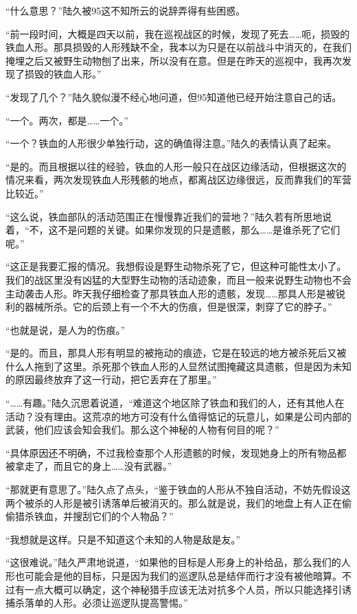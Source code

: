 “什么意思？”陆久被95这不知所云的说辞弄得有些困惑。

“前一段时间，大概是四天以前，我在巡视战区的时候，发现了死去……呃，损毁的铁血人形。那具损毁的人形残缺不全，我本以为只是在以前战斗中消灭的，在我们掩埋之后又被野生动物刨了出来，所以没有在意。但是在昨天的巡视中，我再次发现了损毁的铁血人形。”

“发现了几个？”陆久貌似漫不经心地问道，但95知道他已经开始注意自己的话。

“一个。两次，都是……一个。”

“一个？铁血的人形很少单独行动，这的确值得注意。”陆久的表情认真了起来。

“是的。而且根据以往的经验，铁血的人形一般只在战区边缘活动，但根据这次的情况来看，两次发现铁血人形残骸的地点，都离战区边缘很远，反而靠我们的军营比较近。”

“这么说，铁血部队的活动范围正在慢慢靠近我们的营地？”陆久若有所思地说着，“不，这不是问题的关键。如果你发现的只是遗骸，那么……是谁杀死了它们呢。”

“这正是我要汇报的情况。我想假设是野生动物杀死了它，但这种可能性太小了。我们的战区里没有凶猛的大型野生动物的活动迹象，而且一般来说野生动物也不会主动袭击人形。昨天我仔细检查了那具铁血人形的遗骸，发现……那具人形是被锐利的器械所杀。它的后颈上有一个不大的伤痕，但是很深，刺穿了它的脖子。”

“也就是说，是人为的伤痕。”

“是的。而且，那具人形有明显的被拖动的痕迹，它是在较远的地方被杀死后又被什么人拖到了这里。杀死那个铁血人形的人显然试图掩藏这具遗骸，但是因为未知的原因最终放弃了这一行动，把它丢弃在了那里。”

“……有趣。”陆久沉思着说道，“难道这个地区除了铁血和我们的人，还有其他人在活动？没有理由。这荒凉的地方可没有什么值得惦记的玩意儿，如果是公司内部的武装，他们应该会知会我们。那么这个神秘的人物有何目的呢？”

“具体原因还不明确，不过我检查那个人形遗骸的时候，发现她身上的所有物品都被拿走了，而且它的身上……没有武器。”

“那就更有意思了。”陆久点了点头，“鉴于铁血的人形从不独自活动，不妨先假设这两个被杀的人形是被引诱落单后被消灭的。那么就是说，我们的地盘上有人正在偷偷猎杀铁血，并搜刮它们的个人物品？”

“我想就是这样。只是不知道这个未知的人物是敌是友。”

“这很难说。”陆久严肃地说道，“如果他的目标是人形身上的补给品，那么我们的人形也可能会是他的目标，只是因为我们的巡逻队总是结伴而行才没有被他暗算。不过有一点大概可以确定，这个神秘猎手应该无法对抗多个人员，所以只能选择引诱捕杀落单的人形。必须让巡逻队提高警惕。”

